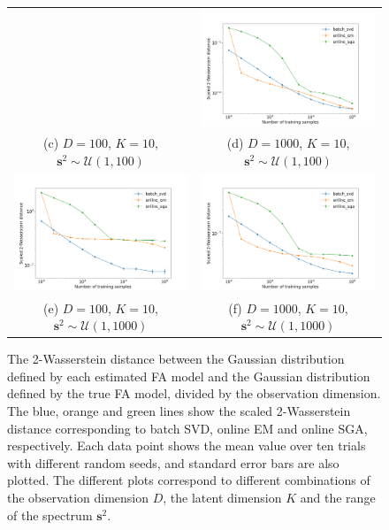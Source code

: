 \documentclass[msc,deptreport.inf]{infthesis} %
\newcommand{\matr}[1]{\mathbf{#1}}
\begin{document}
\begin{figure}[!htbp]
\begin{tabular}{cc}
		 & \includegraphics[width=70mm]{plots/online_fa_wasserstein__observation_dim=1000__latent_dim=10__spectrum_min=1__spectrum_max=100.png} \\
		 (c) $D=100$, $K=10$, $\matr{s}^2 \sim \mathcal{U}(1, 100)$ 
		 & (d) $D=1000$, $K=10$, $\matr{s}^2 \sim \mathcal{U}(1, 100)$\\[6pt]
		 \includegraphics[width=70mm]{plots/online_fa_wasserstein__observation_dim=100__latent_dim=10__spectrum_min=1__spectrum_max=1000.png} 
		 & \includegraphics[width=70mm]{plots/online_fa_wasserstein__observation_dim=1000__latent_dim=10__spectrum_min=1__spectrum_max=1000.png} \\
		 (e) $D=100$, $K=10$, $\matr{s}^2 \sim \mathcal{U}(1, 1000)$ 
		 & (f) $D=1000$, $K=10$, $\matr{s}^2 \sim \mathcal{U}(1, 1000)$\\[6pt]
	\end{tabular}
	\caption{The 2-Wasserstein distance between the Gaussian distribution defined by each estimated FA model and the Gaussian distribution defined by the true FA model, divided by the observation dimension. The blue, orange and green lines show the scaled 2-Wasserstein distance corresponding to batch SVD, online EM and online SGA, respectively. Each data point shows the mean value over ten trials with different random seeds, and standard error bars are also plotted. The different plots correspond to different combinations of the observation dimension $D$, the latent dimension $K$ and the range of the spectrum $\matr{s}^2$.}
	\label{fig:fa_wasserstein}
\end{figure}
\end{document}
